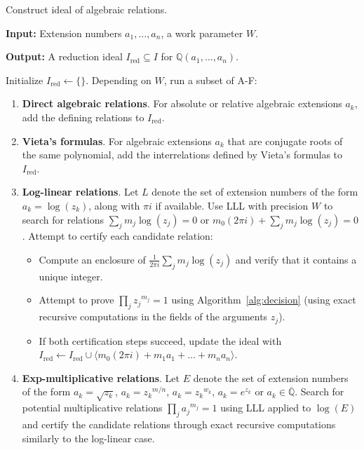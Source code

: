 \documentclass[sigconf,screen,urlbreakonhyphens]{acmart}
\begin{document}
\begin{algorithm}
\caption{Construct ideal of algebraic relations.}

\SetAlgoLined

\textbf{Input:} Extension numbers $a_1,\ldots,a_n$, a work parameter $W$.

\textbf{Output:} A reduction ideal $I_{\text{red}} \subseteq I$ for $\mathbb{Q}(a_1,\ldots,a_n)$.

\vspace*{-0.15cm}
\hrulefill
\vspace*{-0.05cm}

Initialize $I_{\text{red}} \gets \{ \}$.
Depending on $W$, run a subset of A-F:

\begin{enumerate}[{A}]
\item \textbf{Direct algebraic relations}. For absolute or relative algebraic
extensions $a_k$, add the defining relations to $I_{\text{red}}$.

\item \textbf{Vieta's formulas}. For algebraic extensions $a_k$ that are conjugate roots
of the same polynomial, add the interrelations defined by Vieta's formulas to $I_{\text{red}}$.

\item \textbf{Log-linear relations}. Let $L$ denote the set of extension numbers of the form $a_k = \log(z_k)$,
along with $\pi i$ if available.
Use LLL with precision $W$ to search for relations $\sum_j m_j \log(z_j) = 0$ or $m_0 (2 \pi i) + \sum_j m_j \log(z_j) = 0$.
Attempt to certify each candidate relation:
\begin{itemize}
\item Compute an enclosure of $\tfrac{1}{2 \pi i} \sum_j m_j \log(z_j)$ and verify that it contains a unique integer.
\item Attempt to prove $\prod_j {z_j}^{m_j} = 1$ using Algorithm~\ref{alg:decision} (using exact recursive computations in the fields of the arguments $z_j$).
\item If both certification steps succeed, update the ideal with $I_{\text{red}} \gets I_{\text{red}} \cup \langle m_0 (2 \pi i) + m_1 a_1 + \ldots + m_n a_n \rangle$.
\end{itemize}
\item \textbf{Exp-multiplicative relations}.
Let $E$ denote the set of extension numbers of the form $a_k = \sqrt{z_k}$, $a_k = {z_k}^{m/n}$, $a_k = {z_k}^{w_k}$, $a_k = e^{z_k}$ or $a_k \in \overline{\mathbb{Q}}$.
Search for potential multiplicative relations $\prod_j {a_j}^{m_j} = 1$ using LLL applied to $\log(E)$ and certify the candidate relations through exact recursive computations similarly to the log-linear case.


\end{enumerate}
\end{algorithm}
\end{document}
